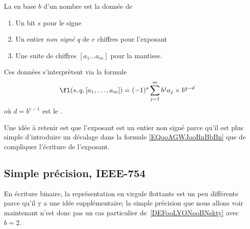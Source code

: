 \begin{definition}     \label{DEFooLYONooBNskty}
	La  en base \( b\) d'un nombre est la donnée de
	\begin{enumerate}
		\item
		      Un bit \( s\) pour le signe
		\item
		      Un entier \emph{non signé} \( q\) de \( e\) chiffres pour l'exposant
		\item
		      Une suite de chiffres \( [a_1\ldots a_m]\) pour la mantisse.
	\end{enumerate}
	Ces données s'interprètent via la formule
	\begin{equation}        \label{EQooAGWJooRuBbBn}
		\fl( s,q,[a_1,\ldots, a_m]  )=(-1)^s\sum_{j=1}^mb^ja_j\times b^{q-d}
	\end{equation}
	où \( d=b^{e-1}\) est le .
\end{definition}
Une idée à retenir est que l'exposant est un entier non signé parce qu'il est plus simple d'introduire un décalage dans la formule \eqref{EQooAGWJooRuBbBn} que de compliquer l'écriture de l'exposant.

\subsection{Simple précision, IEEE-754}

En écriture binaire, la représentation en virgule flottante est un peu différente parce qu'il y a une idée supplémentaire; la simple précision que nous allons voir maintenant n'est donc pas un cas particulier de~\ref{DEFooLYONooBNskty} avec \( b=2\).


